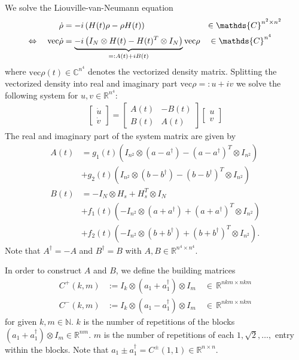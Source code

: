 \documentclass[12pt]{article}
\begin{document}
We solve the Liouville-van-Neumann equation
\begin{align*}
    \dot \rho &= -i\left(H(t)\rho - \rho H(t)\right)  \hspace{17ex} \in \mathds{C}^{n^2 \times n^2}\\
    \Leftrightarrow \quad \text{vec} \dot  {\rho} &= \underbrace{-i\left( I_N \otimes H(t) - H(t)^T \otimes I_N \right)}_{=:A(t) + iB(t)} \text{vec} {\rho} \quad \in \mathds{C}^{ n^4}
\end{align*}
where $\text{vec} \rho(t) \in \mathds{C}^{n^4}$ denotes the vectorized density matrix.
Splitting the vectorized density into real and imaginary part $\text{vec} \rho =: u + i v$ we solve the following system for $u,v \in\mathds{R}^{n^4}$:
\begin{align}
  \begin{bmatrix}
    \dot u \\ \dot v
  \end{bmatrix} = 
  \begin{bmatrix}
      A(t) & -B(t) \\
      B(t) & A(t) 
  \end{bmatrix}
  \begin{bmatrix}
     u \\  v
  \end{bmatrix}
\end{align}
The real and imaginary part of the system matrix are given by
\begin{align*}
    A(t) &= g_1(t)\left( I_{n^2} \otimes (a-a^{\dagger}) - (a-a^{\dagger})^T \otimes I_{n^2}\right) \\
         &+ g_2(t) \left( I_{n^2} \otimes (b-b^{\dagger}) - (b-b^{\dagger})^T \otimes I_{n^2}\right) \\
    B(t) &= - I_N \otimes H_s + H_s^T\otimes I_N \\
         &+ f_1(t) \left( - I_{n^2} \otimes (a+a^{\dagger}) + (a+a^{\dagger})^T \otimes I_{n^2}\right)\\
         &+ f_2(t) \left( -I_{n^2} \otimes (b+b^{\dagger}) + (b+b^{\dagger})^T \otimes I_{n^2}\right).
\end{align*}
Note that $A^{\dagger} = -A$ and $B^{\dagger} = B$ with $A,B \in \mathds{R}^{n^4\times n^4}$.

In order to construct $A$ and $B$, we define the building matrices
\begin{align*}
    C^+(k,m) &:= I_k \otimes (a_1 + a_1^{\dagger}) \otimes I_m \quad \in \, \mathds{R}^{nkm \times nkm} \\
    C^-(k,m) &:= I_k \otimes (a_1 - a_1^{\dagger}) \otimes I_m \quad \in \, \mathds{R}^{nkm \times nkm}
\end{align*}
for given $k,m\in\mathds{N}$. $k$ is the number of repetitions of the blocks $(a_1+a_1^{\dagger})\otimes I_m\in \mathds{R}^{nm}$. $m$ is the number of repetitions of each $1, \sqrt 2, \dots,$ entry within the blocks. Note that $a_1 \pm a_1^{\dagger} = C^{\pm}(1,1) \in \mathds{R}^{n\times n}$. 
\end{document}
